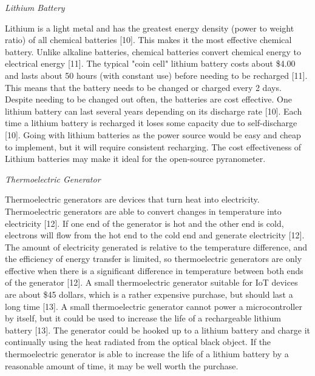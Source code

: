 \documentclass[10pt,draftclsnofoot,onecolumn,letterpaper]{article}
\begin{document}
    {\fontsize{10pt}{12.0pt}\textit{Lithium Battery}\\\selectfont 
    \par}\par
    {\fontsize{10pt}{12.0pt}Lithium is a light metal and has the greatest energy density (power to weight ratio) of all chemical batteries [10]. This makes it the most effective chemical battery. Unlike alkaline batteries, chemical batteries convert chemical energy to electrical energy [11]. The typical "coin cell" lithium battery costs about \$4.00 and lasts about 50 hours (with constant use) before needing to be recharged [11]. This means that the battery needs to be changed or charged every 2 days. Despite needing to be changed out often, the batteries are cost effective. One lithium battery can last several years depending on its discharge rate [10]. Each time a lithium battery is recharged it loses some capacity due to self-discharge [10]. Going with lithium batteries as the power source would be easy and cheap to implement, but it will require consistent recharging. The cost effectiveness of Lithium batteries may make it ideal for the open-source pyranometer.\\\selectfont 
    \par}\par
    {\fontsize{10pt}{12.0pt}\textit{Thermoelectric Generator}\\\selectfont 
    \par}\par
    {\fontsize{10pt}{12.0pt}Thermoelectric generators are devices that turn heat into electricity. Thermoelectric generators are able to convert changes in temperature into electricity [12]. If one end of the generator is hot and the other end is cold, electrons will flow from the hot end to the cold end and generate electricity [12]. The amount of electricity generated is relative to the temperature difference, and the efficiency of energy transfer is limited, so thermoelectric generators are only effective when there is a significant difference in temperature between both ends of the generator [12]. A small thermoelectric generator suitable for IoT devices are about \$45 dollars, which is a rather expensive purchase, but should last a long time [13]. A small thermoelectric generator cannot power a microcontroller by itself, but it could be used to increase the life of a rechargeable lithium battery [13]. The generator could be hooked up to a lithium battery and charge it continually using the heat radiated from the optical black object. If the thermoelectric generator is able to increase the life of a lithium battery by a reasonable amount of time, it may be well worth the purchase.\\
    \par}\par
    
\end{document}
